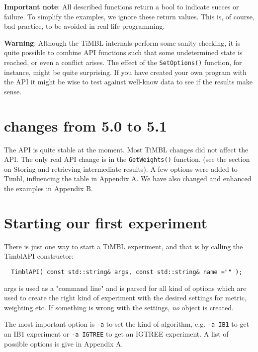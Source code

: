 {\bf Important note}: All described functions return a bool to indicate
succes or failure. To simplify the examples, we ignore these return
values. This is, of course, bad practice, to be avoided in
real life programming.

{\bf Warning}: Although the TiMBL internals perform some sanity
checking, it is quite possible to combine API functions such
that some undetermined state is reached, or even a conflict
arises. The effect of the {\tt SetOptions()} function, for instance,
might be quite surprising. If you have created your own program
with the API it might be wise to test against well-know data to see if
the results make sense.

\section{changes from 5.0 to 5.1}

The API is quite stable at the moment. Most TiMBL changes did not
affect the API. The only real API change is in the {\tt GetWeights()}
function. (see the section on Storing and retrieving intermediate
results).  A few options were added to Timbl, influencing the table in
Appendix A. We have also changed and enhanced the examples in Appendix
B.

\section{Starting our first experiment}

There is just one way to start a TiMBL experiment, and that is by
calling the TimblAPI constructor:

\begin{footnotesize}
\begin{verbatim}
  TimblAPI( const std::string& args, const std::string& name ="" );
\end{verbatim}
\end{footnotesize}

args is used as a "command line" and is parsed for all kind of options
which are used to create the right kind of experiment with the desired
settings for metric, weighting etc. If something is wrong with the
settings, {\em no}\/ object is created.

The most important option is {\tt -a}  to set the kind of algorithm,
e.g. {\tt -a IB1} to get an IB1 experiment or {\tt -a IGTREE} to get an IGTREE
experiment. A list of possible options is give in Appendix A.

